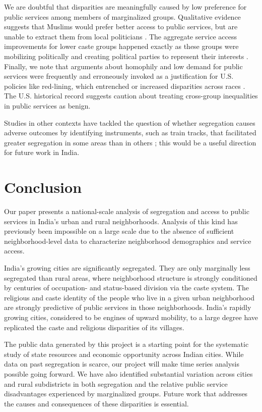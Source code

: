 \documentclass[12pt]{article}
\begin{document}
  We are doubtful that disparities are meaningfully caused by low preference for public services among members of marginalized groups. Qualitative evidence suggests that Muslims would prefer better access to public services, but are unable to extract them from local politicians \citep{jaffrelot2012,tariq2025}. The aggregate service access improvements for lower caste groups happened exactly as these groups were mobilizing politically and creating political parties to represent their interests \citep{banerjee2007,aneja2022}. Finally, we note that arguments about homophily and low demand for public services were frequently and erroneously invoked as a justification for U.S. policies like red-lining, which entrenched or increased disparities across races \citep{blank2004measuring}. The U.S. historical record suggests caution about treating cross-group inequalities in public services as benign.

Studies in other contexts have tackled the question of whether segregation causes adverse outcomes by identifying instruments, such as train tracks, that facilitated greater segregation in some areas than in others \citep{cutler1997, ananat2011wrong, aaronson2020}; this would be a useful direction for future work in India.

  \section{Conclusion} \label{sec:conclusion}

Our paper presents a national-scale analysis of segregation and access to public services in India's urban and rural neighborhoods. Analysis of this kind has previously been impossible on a large scale due to the absence of sufficient neighborhood-level data to characterize neighborhood demographics and service access.

  India's growing cities are significantly segregated. They are only marginally less segregated than rural areas, where neighborhood structure is strongly conditioned by centuries of occupation- and status-based division via the caste system. The religious and caste identity of the people who live in a given urban neighborhood are strongly predictive of public services in those neighborhoods. India's rapidly growing cities, considered to be engines of upward mobility, to a large degree have replicated the caste and religious disparities of its villages.

  The public data generated by this project is a starting point for the systematic study of state resources and economic opportunity across Indian cities. While data on past segregation is scarce, our project will make time series analysis possible going forward. We have also identified substantial variation across cities and rural subdistricts in both segregation and the relative public service disadvantages experienced by marginalized groups. Future work that addresses the causes and consequences of these disparities is essential.
  
\end{document}
